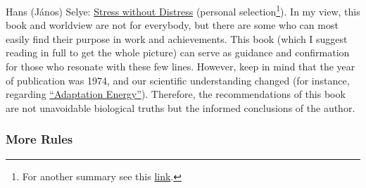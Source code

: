 \documentclass{article}
\begin{document}
Hans (János) Selye: \href{https://www.goodreads.com/book/show/625310.Stress_without_Distress}{Stress without Distress} (personal selection\footnote{For another summary see this \href{https://whatijustread.blogspot.com/2021/10/stress-without-distress-by-hans-selye.html}{link}.}).
In my view, this book and worldview are not for everybody, but there are some who can most easily find their purpose in work and achievements. This book (which I suggest reading in full to get the whole picture) can serve as guidance and confirmation for those who resonate with these few lines.
However, keep in mind that the year of publication was 1974, and our scientific understanding changed (for instance, regarding \href{https://doi.org/10.1016/j.plrev.2021.03.001}{``Adaptation Energy''}). Therefore, the recommendations of this book are not unavoidable biological truths but the informed conclusions of the author.

\subsubsection{More Rules}
\end{document}
